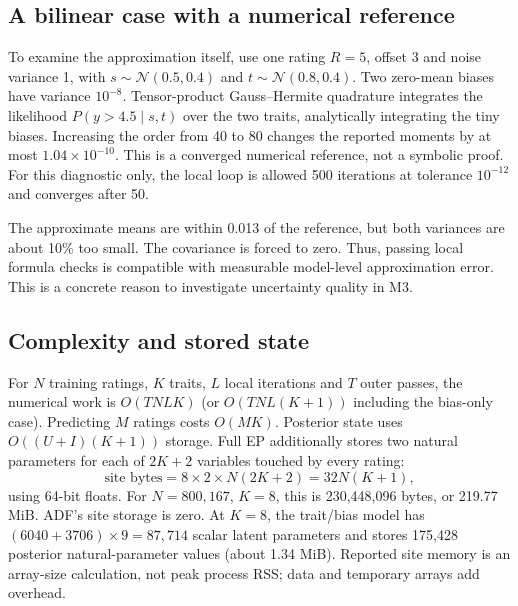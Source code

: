 \documentclass[11pt,a4paper]{article}
\newcommand{\N}{\mathcal N}
\begin{document}
\subsection{A bilinear case with a numerical reference}
To examine the approximation itself, use one rating $R=5$, offset 3 and noise
variance 1, with $s\sim\N(0.5,0.4)$ and $t\sim\N(0.8,0.4)$. Two zero-mean
biases have variance $10^{-8}$. Tensor-product Gauss--Hermite quadrature
integrates the likelihood $P(y>4.5\mid s,t)$ over the two traits, analytically
integrating the tiny biases. Increasing the order from 40 to 80 changes the
reported moments by at most $1.04\times10^{-10}$. This is a converged numerical
reference, not a symbolic proof. For this diagnostic only, the local loop is
allowed 500 iterations at tolerance $10^{-12}$ and converges after 50.

\begin{table}[htbp]\centering\small

\caption{One-observation validation. ``Reference change'' compares quadrature
orders 40 and 80. The nonzero exact posterior covariance cannot be retained by
the factorized approximation.}
\label{tab:quadrature}
\end{table}

The approximate means are within 0.013 of the reference, but both variances are
about 10\% too small. The covariance is forced to zero. Thus, passing local
formula checks is compatible with measurable model-level approximation error.
This is a concrete reason to investigate uncertainty quality in M3.

\subsection{Complexity and stored state}
For $N$ training ratings, $K$ traits, $L$ local iterations and $T$ outer passes,
the numerical work is $O(TNLK)$ (or $O(TNL(K+1))$ including the bias-only case).
Predicting $M$ ratings costs $O(MK)$. Posterior state uses
$O((U+I)(K+1))$ storage. Full EP additionally stores two natural parameters for
each of $2K+2$ variables touched by every rating:
\begin{equation}
\text{site bytes}=8\times2\times N(2K+2)=32N(K+1),
\end{equation}
using 64-bit floats. For $N=800{,}167$, $K=8$, this is 230,448,096 bytes, or
219.77 MiB. ADF's site storage is zero. At $K=8$, the trait/bias model has
$(6040+3706)\times9=87{,}714$ scalar latent parameters and stores 175,428
posterior natural-parameter values (about 1.34 MiB). Reported site memory is an
array-size calculation, not peak process RSS; data and temporary arrays add overhead.
\end{document}
